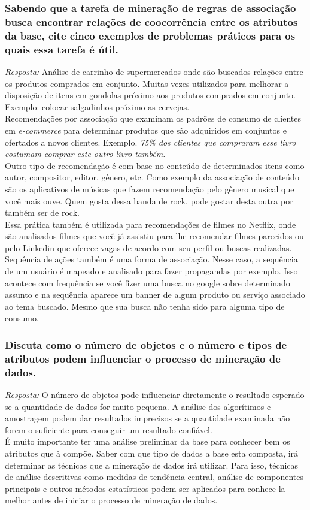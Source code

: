 \documentclass{article}
\begin{document}
\subsubsection{Sabendo que a tarefa de mineração de regras de associação busca encontrar relações de coocorrência entre os atributos da base, cite cinco exemplos de problemas práticos para os quais essa tarefa é útil.}
\textit{Resposta:} Análise de carrinho de supermercados onde são buscados relações entre os produtos comprados em conjunto. Muitas vezes utilizados para melhorar a disposição de itens em gondolas próximo aos produtos comprados em conjunto. Exemplo: colocar salgadinhos próximo as cervejas.\\
Recomendações por associação que examinam os padrões de consumo de clientes em \textit{e-commerce} para determinar produtos que são adquiridos em conjuntos e ofertados a novos clientes.
Exemplo. \textit{75\% dos clientes que compraram esse livro costumam comprar este outro livro também.}  \\
Outro tipo de recomendação é com base no conteúdo de determinados itens como autor, compositor, editor, gênero, etc. Como exemplo da associação de conteúdo são os aplicativos de músicas que fazem recomendação pelo gênero musical que você mais ouve. Quem gosta dessa banda de rock, pode gostar desta outra por também ser de rock. \\
Essa prática também é utilizada para recomendações de filmes no Netflix, onde são analisados filmes que você já assistiu para lhe recomendar filmes parecidos ou pelo Linkedin que oferece vagas de acordo com seu perfil ou buscas realizadas. \\
Sequência de ações também é uma forma de associação. Nesse caso, a sequência de um usuário é mapeado e analisado para fazer propagandas por exemplo. Isso acontece com frequência se você fizer uma busca no google sobre determinado assunto e na sequência aparece um banner de algum produto ou serviço associado ao tema buscado. Mesmo que sua busca não tenha sido para alguma tipo de consumo. \\


\subsubsection{Discuta como o número de objetos e o número e tipos de atributos podem influenciar o processo de mineração de dados.}
\textit{Resposta:} O número de objetos pode influenciar diretamente o resultado esperado se a quantidade de dados for muito pequena. A análise dos algorítimos e amostragem podem dar resultados imprecisos se a quantidade examinada não forem o suficiente para conseguir um resultado confiável. \\
É muito importante ter uma análise preliminar da base para conhecer bem os atributos que à compõe. Saber com que tipo de dados a base esta composta, irá determinar as técnicas que a mineração de dados irá utilizar. Para isso, técnicas de análise descritivas como medidas de tendência central, análise de componentes principais e outros métodos estatísticos podem ser aplicados para conhece-la melhor antes de iniciar o processo de mineração de dados.
\end{document}
